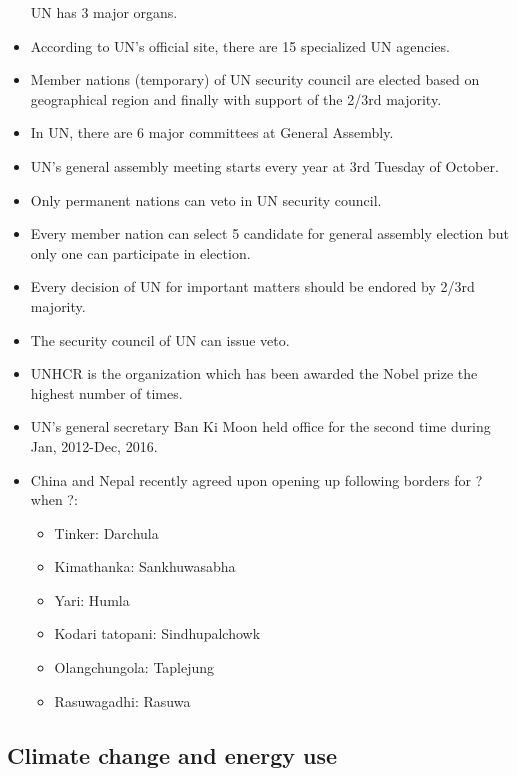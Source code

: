 \documentclass[]{book}
\providecommand{\tightlist}{%
  \setlength{\itemsep}{0pt}\setlength{\parskip}{0pt}}
\begin{document}
\begin{itemize}
  UN has 3 major organs.
\item
  According to UN's official site, there are 15 specialized UN agencies.
\item
  Member nations (temporary) of UN security council are elected based on geographical region and finally with support of the 2/3rd majority.
\item
  In UN, there are 6 major committees at General Assembly.
\item
  UN's general assembly meeting starts every year at 3rd Tuesday of October.
\item
  Only permanent nations can veto in UN security council.
\item
  Every member nation can select 5 candidate for general assembly election but only one can participate in election.
\item
  Every decision of UN for important matters should be endored by 2/3rd majority.
\item
  The security council of UN can issue veto.
\item
  UNHCR is the organization which has been awarded the Nobel prize the highest number of times.
\item
  UN's general secretary Ban Ki Moon held office for the second time during Jan, 2012-Dec, 2016.
\item
  China and Nepal recently agreed upon opening up following borders for ? when ?:

  \begin{itemize}
  \tightlist
  \item
    Tinker: Darchula
  \item
    Kimathanka: Sankhuwasabha
  \item
    Yari: Humla
  \item
    Kodari tatopani: Sindhupalchowk
  \item
    Olangchungola: Taplejung
  \item
    Rasuwagadhi: Rasuwa
  \end{itemize}
\end{itemize}

\hypertarget{climate-change-and-energy-use}{%
\subsection{Climate change and energy use}\label{climate-change-and-energy-use}}
\end{document}
